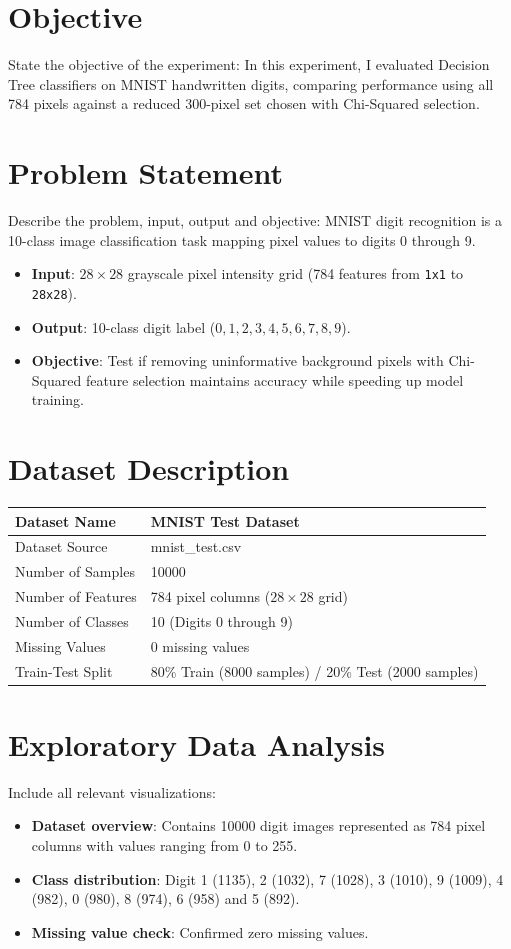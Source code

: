 \documentclass[12pt,a4paper]{article}
\begin{document}
\section{Objective}
State the objective of the experiment:
In this experiment, I evaluated Decision Tree classifiers on MNIST handwritten digits, comparing performance using all 784 pixels against a reduced 300-pixel set chosen with Chi-Squared selection.

\section{Problem Statement}
Describe the problem, input, output and objective:
MNIST digit recognition is a 10-class image classification task mapping pixel values to digits 0 through 9.
\begin{itemize}
\item \textbf{Input}: $28 \times 28$ grayscale pixel intensity grid (784 features from \texttt{1x1} to \texttt{28x28}).
\item \textbf{Output}: 10-class digit label ($0, 1, 2, 3, 4, 5, 6, 7, 8, 9$).
\item \textbf{Objective}: Test if removing uninformative background pixels with Chi-Squared feature selection maintains accuracy while speeding up model training.
\end{itemize}

\section{Dataset Description}
\begin{longtable}{|p{6cm}|p{8cm}|}
\hline
Dataset Name & MNIST Test Dataset \\ \hline
Dataset Source & mnist\_test.csv \\ \hline
Number of Samples & 10000 \\ \hline
Number of Features & 784 pixel columns ($28 \times 28$ grid) \\ \hline
Number of Classes & 10 (Digits 0 through 9) \\ \hline
Missing Values & 0 missing values \\ \hline
Train-Test Split & 80\% Train (8000 samples) / 20\% Test (2000 samples) \\ \hline
\end{longtable}

\section{Exploratory Data Analysis}
Include all relevant visualizations:
\begin{itemize}
\item \textbf{Dataset overview}: Contains 10000 digit images represented as 784 pixel columns with values ranging from 0 to 255.
\item \textbf{Class distribution}: Digit 1 (1135), 2 (1032), 7 (1028), 3 (1010), 9 (1009), 4 (982), 0 (980), 8 (974), 6 (958) and 5 (892).
\item \textbf{Missing value check}: Confirmed zero missing values.
\end{itemize}
\end{document}
